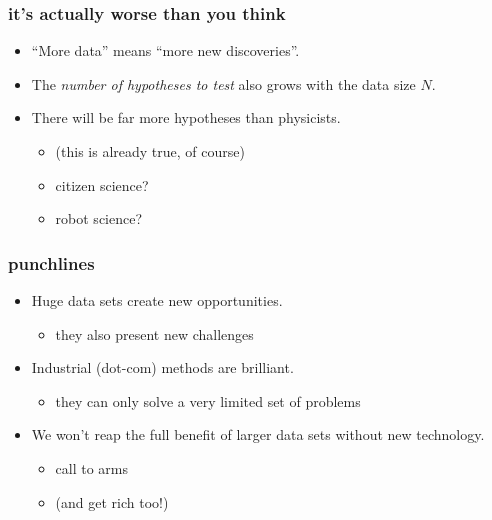 \documentclass[pdftex]{beamer}
\newcommand{\conclusion}{
\begin{frame}
  \frametitle{punchlines}
  \begin{itemize}
  \item Huge data sets create new opportunities.
    \begin{itemize}
    \item they also present new challenges
    \end{itemize}
  \item Industrial (dot-com) methods are brilliant.
    \begin{itemize}
    \item they can only solve a very limited set of problems
    \end{itemize}
  \item We won't reap the full benefit of larger data sets without new technology.
    \begin{itemize}
    \item call to arms
    \item (and get rich too!)
    \end{itemize}
  \end{itemize}
\end{frame}
}
\begin{document}
\begin{frame}
  \frametitle{it's actually worse than you think}
  \begin{itemize}
  \item ``More data'' means ``more new discoveries''.
  \item The \emph{number of hypotheses to test} also grows with the data size $N$.
  \item There will be far more hypotheses than physicists.
    \begin{itemize}
    \item (this is already true, of course)
    \item citizen science?
    \item robot science?
    \end{itemize}
  \end{itemize}
\end{frame}

\conclusion
\end{document}
